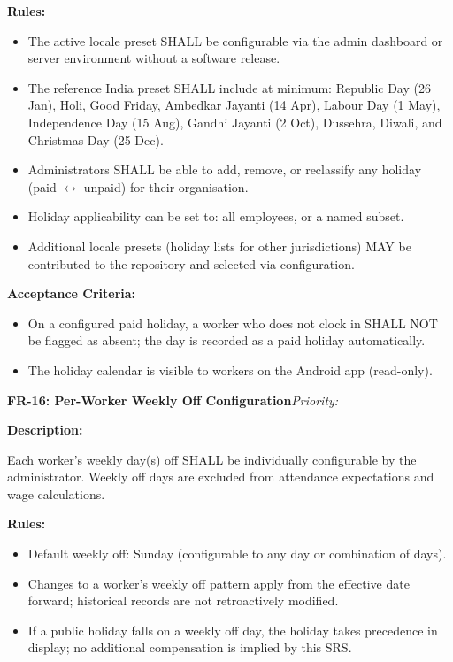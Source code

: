 \documentclass[12pt, a4paper]{article}
\newcommand{\frblock}[2]{%
    \noindent\textbf{#1}\hfill\textit{Priority: #2}%
    \par\smallskip%
}
\newcommand{\srsfield}[1]{\noindent\textbf{#1:}\par}
\begin{document}
\srsfield{Rules}
\begin{itemize}
    \item The active locale preset SHALL be configurable via the admin
          dashboard or server environment without a software release.
    \item The reference India preset SHALL include at minimum: Republic
          Day (26 Jan), Holi, Good Friday, Ambedkar Jayanti (14 Apr),
          Labour Day (1 May), Independence Day (15 Aug), Gandhi Jayanti
          (2 Oct), Dussehra, Diwali, and Christmas Day (25 Dec).
    \item Administrators SHALL be able to add, remove, or reclassify any
          holiday (paid $\leftrightarrow$ unpaid) for their organisation.
    \item Holiday applicability can be set to: all employees, or a named
          subset.
    \item Additional locale presets (holiday lists for other
          jurisdictions) MAY be contributed to the repository and
          selected via configuration.
\end{itemize}

\srsfield{Acceptance Criteria}
\begin{itemize}
    \item On a configured paid holiday, a worker who does not clock in
          SHALL NOT be flagged as absent; the day is recorded as a paid
          holiday automatically.
    \item The holiday calendar is visible to workers on the Android app
          (read-only).
\end{itemize}

\bigskip
\frblock{FR-16: Per-Worker Weekly Off Configuration}{}

\srsfield{Description}
Each worker's weekly day(s) off SHALL be individually configurable by
the administrator. Weekly off days are excluded from attendance
expectations and wage calculations.

\srsfield{Rules}
\begin{itemize}
    \item Default weekly off: Sunday (configurable to any day or
          combination of days).
    \item Changes to a worker's weekly off pattern apply from the
          effective date forward; historical records are not retroactively
          modified.
    \item If a public holiday falls on a weekly off day, the holiday
          takes precedence in display; no additional compensation is
          implied by this SRS.
\end{itemize}
\end{document}
